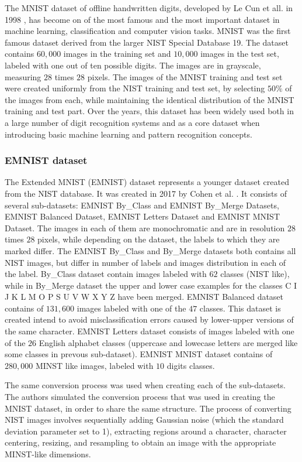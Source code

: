 \documentclass[eng]{simposium}
\begin{document}
The MNIST dataset of offline handwritten digits, developed by Le Cun et all. in 1998 \cite{8}, has become on of the most famous and the most important dataset in machine learning, 
classification and computer vision tasks. 
MNIST was the first famous dataset derived from the larger NIST Special Database 19. 
The dataset contains $60,000$ images in the training set and $10,000$ images in the test set, labeled with one out of ten possible digits. 
The images are in grayscale, measuring $28$ times $28$ pixels. 
The images of the MNIST training and test set were created uniformly from the NIST training and test set, 
by selecting $50\%$ of the images from each, while maintaining the identical distribution of the MNIST training and test part. 
Over the years, this dataset has been widely used both in a large number of digit recognition systems and as a core dataset 
when introducing basic machine learning and pattern recognition concepts. 

\subsubsection{EMNIST dataset}

The Extended MNIST (EMNIST) dataset represents a younger dataset created from the NIST database. 
It was created in 2017 by Cohen et al. \cite{1}. 
It consists of several sub-datasets: EMNIST By\_Class and EMNIST By\_Merge Datasets, EMNIST Balanced Dataset, 
EMNIST Letters Dataset and EMNIST MNIST Dataset. 
The images in each of them are monochromatic and are in resolution $28$ times $28$ pixels, 
while depending on the dataset, the labels to which they are marked differ. 
The EMNIST By\_Class and By\_Merge datasets both contains all NIST images, but differ in number of labels and images distribution 
in each of the label. By\_Class dataset contain images labeled with $62$ classes (NIST like), while in By\_Merge dataset 
the upper and lower case examples for the classes C I J K L M O P S U V W X Y Z have been merged. 
EMNIST Balanced dataset contains of $131,600$ images labeled with one of the $47$ classes. 
This dataset is created intend to avoid misclassification errors caused by lower-upper versions of the same character. 
EMNIST Letters dataset consists of images labeled with one of the $26$ English alphabet classes 
(uppercase and lowecase letters are merged like some classes in prevous sub-dataset). 
EMNIST MNIST dataset contains of $280,000$ MINST like images, labeled with $10$ digits classes. 

The same conversion process was used when creating each of the sub-datasets. 
The authors simulated the conversion process that was used in creating the MNIST dataset, in order 
to share the same structure. 
The process of converting NIST images involves sequentially adding Gaussian noise (which the standard deviation parameter set to 1), 
extracting regions around a character, character centering, resizing, and resampling to obtain an image with the appropriate MINST-like dimensions. 
\end{document}
